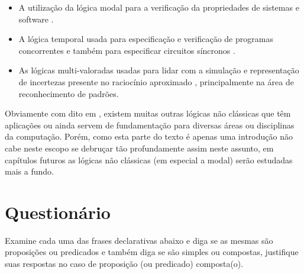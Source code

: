 \begin{itemize}
	\item A utilização da lógica modal para a verificação da propriedades de sistemas e software \cite{harel1979}.
	\item A lógica temporal usada para especificação e verificação de programas
concorrentes \cite{manna1979} e também para especificar circuitos síncronos \cite{halpern1983}.
	\item As lógicas multi-valoradas usadas para lidar com a simulação e representação de
incertezas presente no raciocínio aproximado \cite{BenjaV1}, principalmente na área de reconhecimento de padrões.
\end{itemize}

Obviamente com dito em \cite{BenjaV1}, existem muitas outras lógicas não clássicas que têm aplicações ou ainda servem de fundamentação para diversas áreas ou disciplinas da computação. Porém, como esta parte do texto é apenas uma introdução não cabe neste escopo se debruçar tão profundamente assim neste assunto, em capítulos futuros as lógicas não clássicas (em especial a modal) serão estudadas mais a fundo. 

\section{Questionário}\label{sec:Questionario1part3}

\begin{problem}
    Examine cada uma das frases declarativas abaixo e diga se as mesmas são proposições ou predicados e também diga se são simples ou compostas, justifique suas respostas no caso de proposição (ou predicado) composta(o).
\end{problem}


